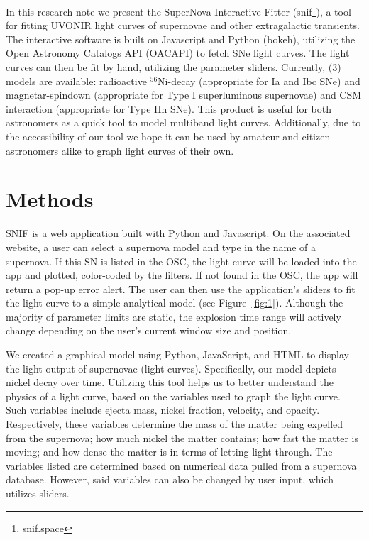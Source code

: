 \documentclass[RNAAS]{aastex62}
\begin{document}
In this research note we present the SuperNova Interactive Fitter (snif\footnote{snif.space}), a tool for fitting UVONIR light curves of supernovae and other extragalactic transients. The interactive software is built on Javascript and Python (bokeh), utilizing the Open Astronomy Catalogs API (OACAPI) to fetch SNe light curves. The light curves can then be fit by hand, utilizing the parameter sliders. Currently, (3) models are available: radioactive $^{56}$Ni-decay (appropriate for Ia and Ibc SNe) and magnetar-spindown (appropriate for Type I superluminous supernovae) and CSM interaction (appropriate for Type IIn SNe). This product is useful for both astronomers as a quick tool to model multiband light curves. Additionally, due to the accessibility of our tool we hope it can be used by amateur and citizen astronomers alike to graph light curves of their own. 

\section{Methods} 

SNIF is a web application built with Python and Javascript. On the associated website, a user can select a supernova model and type in the name of a supernova. If this SN is listed in the OSC, the light curve will be loaded into the app and plotted, color-coded by the filters. If not found in the OSC, the app will return a pop-up error alert. The user can then use the application's sliders to fit the light curve to a simple analytical model (see Figure~\ref{fig:1}). Although the majority of parameter limits are static, the explosion time range will actively change depending on the user's current window size and position. 

We created a graphical model using Python, JavaScript, and HTML to display the light output of supernovae (light curves). Specifically, our model depicts nickel decay over time. Utilizing this tool helps us to better understand the physics of a light curve, based on the variables used to graph the light curve. Such variables include ejecta mass, nickel fraction, velocity, and opacity. Respectively, these variables determine the mass of the matter being expelled from the supernova; how much nickel the matter contains; how fast the matter is moving; and how dense the matter is in terms of letting light through. The variables listed are determined based on numerical data pulled from a supernova database. However, said variables can also be changed by user input, which utilizes sliders.
\end{document}
